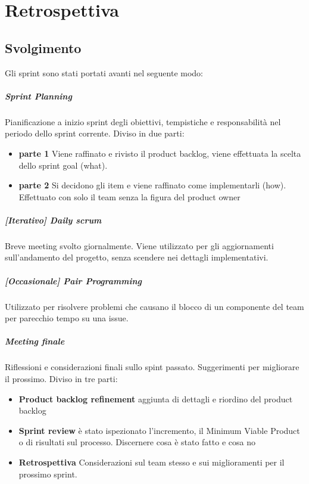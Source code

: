 \chapter{Retrospettiva}
\label{chap:Retrospettiva}

\section{Svolgimento}
Gli sprint sono stati portati avanti nel seguente modo:
    \paragraph{Sprint Planning}
        Pianificazione a inizio sprint degli obiettivi, tempistiche e responsabilità nel periodo dello sprint corrente. Diviso in due parti:
        \begin{itemize}
        \item\textbf{parte 1} 
            Viene raffinato e rivisto il product backlog, viene effettuata la scelta dello sprint goal (what).
        \item\textbf{parte 2}
            Si decidono gli item e viene raffinato come implementarli (how). Effettuato con solo il team senza la figura del product owner
        \end{itemize}
    \paragraph{[Iterativo] Daily scrum} Breve meeting svolto giornalmente. Viene utilizzato per gli aggiornamenti sull'andamento del progetto, senza scendere nei dettagli implementativi.
    \paragraph{[Occasionale] Pair Programming } Utilizzato per risolvere problemi che causano il blocco di un componente del team per parecchio tempo su una issue.
    \paragraph{Meeting finale}
        Riflessioni e considerazioni finali sullo spint passato. Suggerimenti per migliorare il prossimo. Diviso in tre parti: 
        \begin{itemize}
        \item\textbf{Product backlog refinement} aggiunta di dettagli e riordino del product backlog
        \item\textbf{Sprint review} è stato ispezionato l'incremento, il Minimum Viable Product o di risultati sul processo. Discernere cosa è stato fatto e cosa no
        \item\textbf{Retrospettiva} Considerazioni sul team stesso e sui miglioramenti per il prossimo sprint. 
        \end{itemize}

